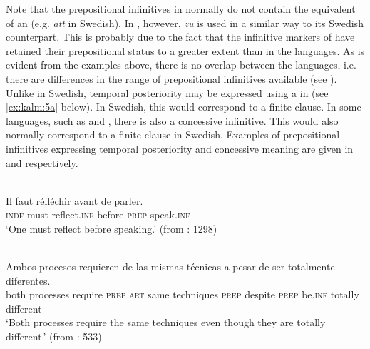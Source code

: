 \documentclass[output=paper]{langscibook}
\begin{document}
Note that the prepositional infinitives in  normally do not contain the equivalent of an  (e.g. \textit{att} in Swedish). In , however, \textit{zu} is used in a similar way to its Swedish counterpart. This is probably due to the fact that the infinitive markers of  have retained their prepositional status to a greater extent than in the  languages. As is evident from the examples above, there is no  overlap between the languages, i.e. there are differences in the range of prepositional infinitives available (see \citealt{Hengenveld1998}). Unlike in Swedish, temporal posteriority may be expressed using a  in  (see \ref{ex:kalm:5a} below). In Swedish, this would correspond to a finite clause. In some  languages, such as  and , there is also a concessive infinitive. This would also normally correspond to a finite clause in Swedish. Examples of  prepositional infinitives expressing temporal posteriority and concessive meaning are given in  and  respectively. 


\ea
\label{ex:kalm:5}
\ea {}\label{ex:kalm:5a}\\ 
\gll Il faut réfléchir avant de parler.\\
\textsc{indf} must reflect.\textsc{inf} before \textsc{prep} speak.\textsc{inf}\\
\glt ‘One must reflect before speaking.’ (from \citealt{Grevisse1993}: 1298) 

\ex {}\label{ex:kalm:5b}\\ 
\gll Ambos procesos requieren de las mismas técnicas a pesar de ser totalmente diferentes.\\
both processes require \textsc{prep} \textsc{art} same techniques \textsc{prep} despite \textsc{prep} be.\textsc{inf} totally different\\
\glt ‘Both processes require the same techniques even though they are totally different.’ (from \citealt{Schulte2007What}: 533)
\z 
\z 
\end{document}

